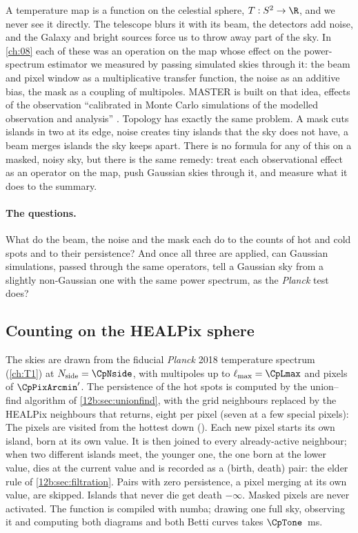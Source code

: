 A temperature map is a function on the celestial sphere, $T:S^2\to\R$, and we never see it directly. The telescope blurs it with
its beam, the detectors add noise, and the Galaxy and bright sources force us to throw away part of the sky. In \cref{ch:08} each
of these was an operation on the map whose effect on the power-spectrum estimator we measured by passing simulated skies through
it: the beam and pixel window as a multiplicative transfer function, the noise as an additive bias, the mask as a coupling of
multipoles. MASTER is built on that idea, effects of the observation ``calibrated in Monte Carlo simulations of the modelled
observation and analysis'' . Topology has exactly the same problem. A mask cuts islands in two at its edge, noise
creates tiny islands that the sky does not have, a beam merges islands the sky keeps apart. There is no formula for any of this on
a masked, noisy sky, but there is the same remedy: treat each observational effect as an operator on the map, push Gaussian skies
through it, and measure what it does to the summary.

\paragraph{The questions.} What do the beam, the noise and the mask each do to the counts of hot and cold spots and to their
persistence? And once all three are applied, can Gaussian simulations, passed through the same operators, tell a Gaussian sky from a
slightly non-Gaussian one with the same power spectrum, as the \textit{Planck} test does?

\subsection{Counting on the HEALPix sphere}
\label{12c:sec:healpix-count}

The skies are drawn from the fiducial \textit{Planck} 2018 temperature spectrum (\cref{ch:T1}) at $N_{\rm side}=\CpNside$, with
multipoles up to $\ell_{\max}=\CpLmax$ and pixels of $\CpPixArcmin'$. The persistence of the hot spots is computed by the union--find
algorithm of \cref{12b:sec:unionfind}, with the grid neighbours replaced by the HEALPix neighbours that 
returns, eight per pixel (seven at a few special pixels):
\noindent The pixels are visited from the hottest down (). Each new pixel starts its own island, born at its own value.
It is then joined to every already-active neighbour; when two different islands meet, the younger one, the one born at the lower
value, dies at the current value and is recorded as a (birth, death) pair: the elder rule of \cref{12b:sec:filtration}. Pairs with
zero persistence, a pixel merging at its own value, are skipped. Islands that never die get death $-\infty$. Masked pixels are never
activated. The function is compiled with numba; drawing one full sky, observing it and computing both diagrams and both Betti curves
takes $\CpTone$~ms.

